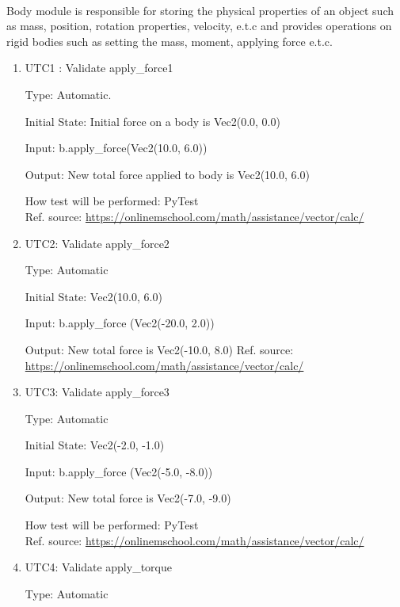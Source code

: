 \documentclass[12pt, titlepage]{article}
\begin{document}
\paragraph{}
Body module is responsible for storing the physical properties of an object such as mass, position, rotation properties, velocity, e.t.c and provides operations on rigid bodies such as setting the mass, moment, applying force e.t.c.
\begin{enumerate}
	

\item{UTC1} {: Validate apply\_force1 \\}

Type: Automatic.
					
Initial State: Initial force on a body is Vec2(0.0, 0.0)
					
Input: b.apply\_force(Vec2(10.0, 6.0))
					
Output: New total force applied to body is Vec2(10.0, 6.0)
					
How test will be performed: PyTest\\ 
Ref. source: \url{https://onlinemschool.com/math/assistance/vector/calc/}
					
\item{UTC2}{: Validate apply\_force2\\}

Type: Automatic
					
Initial State: Vec2(10.0, 6.0)
					
Input: b.apply\_force (Vec2(-20.0, 2.0))
					
Output: New total force is Vec2(-10.0, 8.0)
Ref. source: \url{https://onlinemschool.com/math/assistance/vector/calc/}

\item{UTC3}{: Validate apply\_force3\\}

Type: Automatic

Initial State: Vec2(-2.0, -1.0)

Input: b.apply\_force (Vec2(-5.0, -8.0))

Output: New total force is Vec2(-7.0, -9.0)
					
How test will be performed: PyTest\\
Ref. source: \url{https://onlinemschool.com/math/assistance/vector/calc/}

\item{UTC4}{: Validate apply\_torque\\}

Type: Automatic


\end{enumerate}
\end{document}
